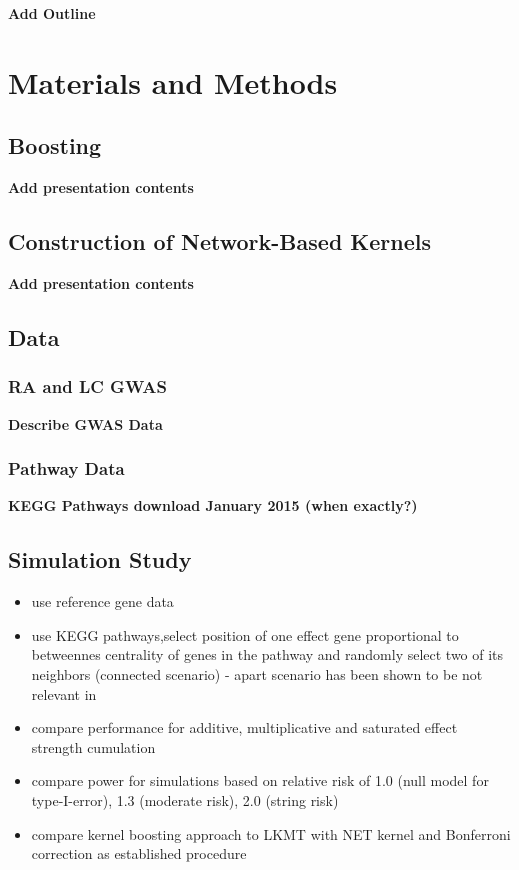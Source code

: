 \documentclass[a4paper,10pt]{article}
\newcommand{\todo}[1]{{\bf\color{red} #1}}
\begin{document}
\todo{Add Outline}

\section{Materials and Methods}

\subsection{Boosting}

\todo{Add presentation contents}

\subsection{Construction of Network-Based Kernels}

\todo{Add presentation contents}

\subsection{Data}

\subsubsection{RA and LC GWAS}

\todo{Describe GWAS Data}

\subsubsection{Pathway Data}

\todo{KEGG Pathways download January 2015 (when exactly?)}

\subsection{Simulation Study}

\begin{itemize}
 \item use reference gene data
 \item use KEGG pathways,select position of one effect gene proportional to betweennes centrality of genes in the pathway and randomly select two of its neighbors (connected scenario) - apart scenario has been shown to be not relevant in \citep{freytag2013}
 \item compare performance for additive, multiplicative and saturated effect strength cumulation
 \item compare power for simulations based on relative risk of 1.0 (null model for type-I-error), 1.3 (moderate risk), 2.0 (string risk)
 \item compare kernel boosting approach to LKMT with NET kernel and Bonferroni correction as established procedure
\end{itemize}
\end{document}
